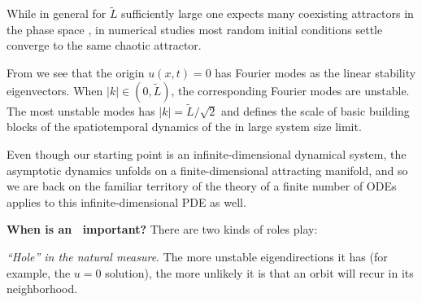 While in general
for $\tilde{L}$ sufficiently large
one expects many 
coexisting attractors in the phase space%
 ,
in numerical studies most random initial
conditions settle converge to the same chaotic attractor. 

From  we see that the origin $u(x,t) = 0$
has Fourier modes as the  linear
stability eigenvectors. 
When $|k| \in (0,\tilde{L})$, the corresponding Fourier modes are
unstable.
The most unstable modes has $|k|=\tilde{L}/\sqrt{2}$ 
and defines the scale of basic building
blocks of the spatiotemporal dynamics of the {\KSe} in large system size limit.


% 
% 
% 
Even though our starting point
is an infinite-dimensional dynamical system, the asymptotic dynamics
unfolds on a finite-dimensional attracting manifold, and so we are back on
the familiar territory of 
the theory of a finite number of ODEs applies to this
infinite-dimensional PDE as well.

    {\bf When is an \eqv\ important?} There are two kinds of roles
{\eqva} play:

{\em ``Hole'' in the natural measure}.
The more unstable eigendirections it has (for example, the
$u=0$ solution), the more unlikely it is  that
an orbit will recur in its neighborhood.

